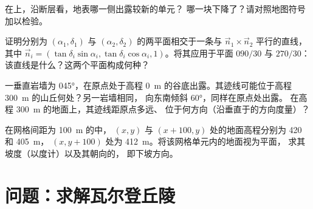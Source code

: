 \begin{exercise}[$\star\star$]\label{exo:b1:geological-maps:9}
在上，沿断层看，地表哪一侧出露较新的单元？
哪一块下降了？请对照地图符号加以检验。
\end{exercise}

\begin{exercise}[$\star\star\star$]\label{exo:b1:geological-maps:10}
证明分别为 $(\alpha_1, \delta_1)$ 与
$(\alpha_2, \delta_2)$ 的两平面相交于一条与 $\vec n_1 \times \vec n_2$ 平行的直线，
其中 $\vec n_i = (\tan\delta_i\sin\alpha_i,
\tan\delta_i\cos\alpha_i, 1)$。将其应用于平面 $090/30$ 与 $270/30$：
该直线是什么？这两个平面构成何种？
\end{exercise}

\begin{exercise}[$\star\star\star$]\label{exo:b1:geological-maps:11}
一垂直岩墙为 \ang{045}，在原点处于高程
\qty{0}{m} 的谷底出露。其迹线可能位于高程
\qty{300}{m} 的山丘何处？另一岩墙相同，
向东南倾斜 \ang{60}，同样在原点处出露。
在高程 \qty{300}{m} 的地面上，其迹线距原点多远、
位于何方向（沿垂直于的方向度量）？
\end{exercise}

\begin{exercise}[$\star\star\star$]\label{exo:b1:geological-maps:12}
在网格间距为 \qty{100}{m} 的中，
$(x, y)$ 与 $(x + 100, y)$ 处的地面高程分别为 420 和 \qty{405}{m}，
$(x, y + 100)$ 处为 \qty{412}{m}。将该网格单元内的地面视为平面，
求其坡度（以度计）以及其朝向的，
即下坡方向。
\end{exercise}

\section{问题：求解瓦尔登丘陵}

